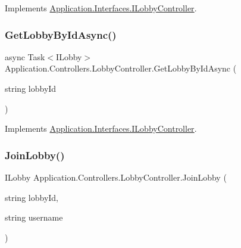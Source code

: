 Implements \mbox{\hyperlink{interface_application_1_1_interfaces_1_1_i_lobby_controller_aaa584fec6fc0e1e0690aa81e7fde3af2}{Application.\+Interfaces.\+I\+Lobby\+Controller}}.

\mbox{\label{class_application_1_1_controllers_1_1_lobby_controller_afe14da64961a1667fd7411484204c692}} 
\subsubsection{\texorpdfstring{Get\+Lobby\+By\+Id\+Async()}{GetLobbyByIdAsync()}}
{\footnotesize\ttfamily async Task$<$I\+Lobby$>$ Application.\+Controllers.\+Lobby\+Controller.\+Get\+Lobby\+By\+Id\+Async (\begin{DoxyParamCaption}\item[{string}]{lobby\+Id }\end{DoxyParamCaption})}



Implements \mbox{\hyperlink{interface_application_1_1_interfaces_1_1_i_lobby_controller_abe3ce90e900391a0c4ffa25195800ab2}{Application.\+Interfaces.\+I\+Lobby\+Controller}}.

\mbox{\label{class_application_1_1_controllers_1_1_lobby_controller_ac081cab03ea49323b57c294ca95c6a09}} 
\subsubsection{\texorpdfstring{Join\+Lobby()}{JoinLobby()}}
{\footnotesize\ttfamily I\+Lobby Application.\+Controllers.\+Lobby\+Controller.\+Join\+Lobby (\begin{DoxyParamCaption}\item[{string}]{lobby\+Id,  }\item[{string}]{username }\end{DoxyParamCaption})}



